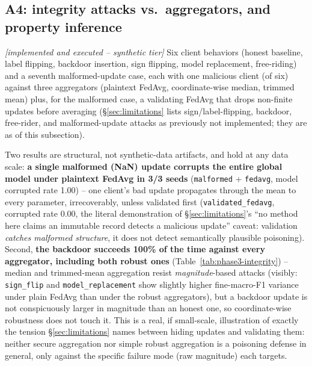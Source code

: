\documentclass[11pt]{article}
\newcommand{\status}[1]{\textit{[#1]}}
\begin{document}
\subsection{A4: integrity attacks vs.\ aggregators, and property inference}
\label{sec:integrity}
\status{implemented and executed -- synthetic tier}
Six client behaviors (honest baseline, label flipping, backdoor insertion,
sign flipping, model replacement, free-riding) and a seventh malformed-update
case, each with one malicious client (of six) against three aggregators
(plaintext FedAvg, coordinate-wise median, trimmed mean) plus, for the
malformed case, a validating FedAvg that drops non-finite updates before
averaging (\S\ref{sec:limitations} lists sign/label-flipping,
backdoor, free-rider, and malformed-update attacks as previously not
implemented; they are as of this subsection).
\resizebox{\textwidth}{!}{}
\label{tab:phase3-integrity}

Two results are structural, not synthetic-data artifacts, and hold at any
data scale: \textbf{a single malformed (NaN) update corrupts the entire
global model under plaintext FedAvg in 3/3 seeds} (\texttt{malformed} +
\texttt{fedavg}, model corrupted rate 1.00) -- one client's bad update
propagates through the mean to every parameter, irrecoverably, unless
validated first (\texttt{validated\_fedavg}, corrupted rate 0.00, the
literal demonstration of \S\ref{sec:limitations}'s ``no method here claims
an immutable record detects a malicious update'' caveat: validation
\emph{catches malformed structure}, it does not detect semantically
plausible poisoning). Second, \textbf{the backdoor succeeds 100\% of the
time against every aggregator, including both robust ones}
(Table~\ref{tab:phase3-integrity}) -- median and trimmed-mean aggregation
resist \emph{magnitude}-based attacks (visibly: \texttt{sign\_flip} and
\texttt{model\_replacement} show slightly higher fine-macro-F1 variance
under plain FedAvg than under the robust aggregators), but a backdoor
update is not conspicuously larger in magnitude than an honest one, so
coordinate-wise robustness does not touch it. This is a real, if
small-scale, illustration of exactly the tension \S\ref{sec:limitations}
names between hiding updates and validating them: neither secure
aggregation nor simple robust aggregation is a poisoning defense in
general, only against the specific failure mode (raw magnitude) each
targets.
\end{document}
